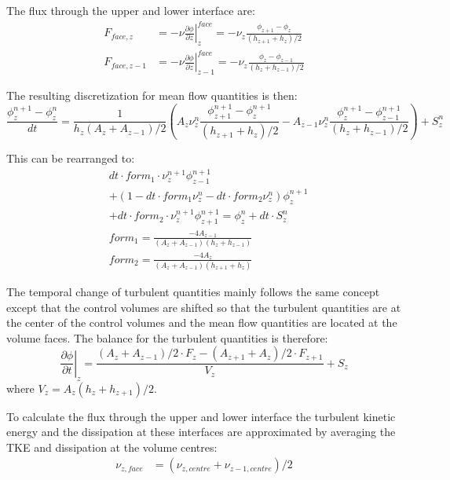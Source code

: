\documentclass[paper=a4, fontsize=12pt]{article}
\begin{document}
The flux through the upper and lower interface are:
\begin{align}
	F_{face,z} &= -\nu\left.\frac{\partial \phi}{\partial z}\right|_{z}^{face} = -\nu_z\frac{\phi_{z+1}-\phi_{z}}{(h_{z+1}+h_{z})/2} \\
	F_{face,z-1} &= -\nu\left.\frac{\partial \phi}{\partial z}\right|_{z-1}^{face} = -\nu_z\frac{\phi_{z}-\phi_{z-1}}{(h_{z}+h_{z-1})/2}
\end{align}

\noindent The resulting discretization for mean flow quantities is then:
\begin{equation}
	\frac{\phi^{n+1}_z-\phi^n_z}{dt} = \frac{1}{h_z\left(A_z+A_{z-1}\right)/2}
	\left(A_z\nu^{n}_z\frac{\phi^{n+1}_{z+1}-\phi^{n+1}_{z}}{(h_{z+1}+h_{z})/2}-A_{z-1}\nu^{n}_z\frac{\phi^{n+1}_{z}-\phi^{n+1}_{z-1}}{(h_{z}+h_{z-1})/2}
	\right)+S^n_z 
\end{equation}

\noindent This can be rearranged to:
\begin{align}
	&dt\cdot form_1\cdot\nu^{n+1}_z\phi^{n+1}_{z-1}\nonumber\\
	&+(1-dt\cdot form_1\nu^{n}_z-dt\cdot form_2\nu^{n}_z)\phi^{n+1}_z\nonumber\\
	&+ dt\cdot form_2\cdot\nu^{n+1}_z\phi^{n+1}_{z+1} = \phi^{n}_{z}+dt\cdot S^n_z\\
	&form_1 = \frac{-4A_{z-1}}{\left(A_z+A_{z-1}\right)\left(h_{z}+h_{z-1}\right)}\\
	&form_2 = \frac{-4A_{z}}{\left(A_z+A_{z-1}\right)\left(h_{z+1}+h_{z}\right)}
\end{align}

The temporal change of turbulent quantities mainly follows the same concept except that the control volumes are shifted so that the turbulent quantities are at the center of the control volumes and the mean flow quantities are located at the volume faces. The balance for the turbulent quantities is therefore:
\begin{equation}
	\left.\frac{\partial\phi}{\partial t}\right|_{z} =
	\frac{\left(A_z+A_{z-1}\right)/2\cdot F_{z}-\left(A_{z+1}+A_z\right)/2\cdot F_{z+1}}{V_z}+S_z
\end{equation}
where $V_z=A_z\left(h_z+h_{z+1}\right)/2$.

To calculate the flux through the upper and lower interface the turbulent kinetic energy and the dissipation at these interfaces are approximated by averaging the TKE and dissipation at the volume centres:
\begin{align}
	\nu_{z,face}&=\left(\nu_{z,centre}+\nu_{z-1,centre}\right)/2 \\
\end{align}
\end{document}
